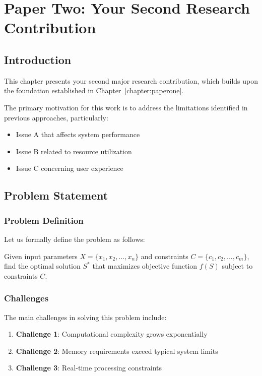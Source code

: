 \chapter{Paper Two: Your Second Research Contribution}
\label{chapter:papertwo}

\section{Introduction}

This chapter presents your second major research contribution, which builds upon the foundation established in Chapter~\ref{chapter:paperone}. \lipsum[1-2]

The primary motivation for this work is to address the limitations identified in previous approaches, particularly:
\begin{itemize}
    \item Issue A that affects system performance
    \item Issue B related to resource utilization  
    \item Issue C concerning user experience
\end{itemize}

\section{Problem Statement}

\subsection{Problem Definition}

\lipsum[3-4]

Let us formally define the problem as follows:
\begin{definition}
Given input parameters $X = \{x_1, x_2, ..., x_n\}$ and constraints $C = \{c_1, c_2, ..., c_m\}$, find the optimal solution $S^*$ that maximizes objective function $f(S)$ subject to constraints $C$.
\end{definition}

\subsection{Challenges}

The main challenges in solving this problem include:
\begin{enumerate}
    \item \textbf{Challenge 1}: Computational complexity grows exponentially
    \item \textbf{Challenge 2}: Memory requirements exceed typical system limits
    \item \textbf{Challenge 3}: Real-time processing constraints
\end{enumerate}

